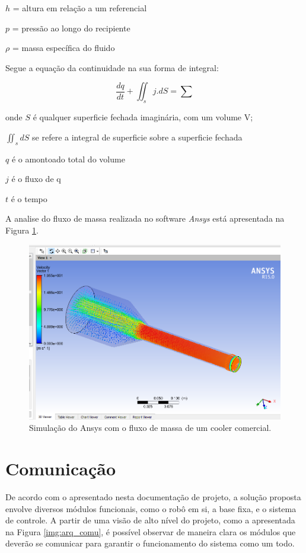 		$h$ = altura em relação a um referencial
		
		$p$ = pressão ao longo do recipiente
		
		$\rho$ = massa específica do fluido

		Segue a equação da continuidade na sua forma de integral:

		\begin{equation}
		\frac{dq}{dt} + \iint_{s}^{ }j . dS= \sum
		\end{equation}
		
		onde $S$ é qualquer superficie fechada imaginária, com um volume V;

		$\iint_{s}^{ }dS$ se refere a integral de superficie sobre a superficie fechada

		$q$ é o amontoado total do volume

		$j$ é o fluxo de q

		$t$ é o tempo


		A analise do fluxo de massa realizada no software \textit{Ansys} está apresentada na Figura \ref{img:analise_fluxo}.

		\begin{figure}[H]
			\centering
			\includegraphics[scale=0.4]{figuras/analise_fluxo.png}
			\caption{Simulação do Ansys com o fluxo de massa de um cooler comercial.}
			\label{img:analise_fluxo}
		\end{figure}



\section{Comunicação} %
\label{sub:comunicação}
	De acordo com o apresentado nesta documentação de projeto, a solução proposta envolve diversos módulos funcionais, como o robô em si, a base fixa, e o sistema de controle. A partir de uma visão de alto nível do projeto, como a apresentada na Figura \ref{img:arq_comu}, é possível observar de maneira clara os módulos que deverão se comunicar para garantir o funcionamento do sistema como um todo.

